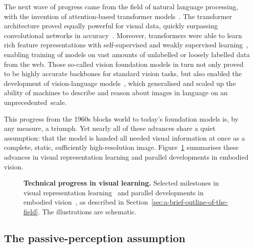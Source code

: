 The next wave of progress came from the field of natural language processing, with the invention of attention-based transformer models~\cite{vaswani2017attention}.
The transformer architecture proved equally powerful for visual data, quickly surpassing convolutional networks in accuracy~\cite{dosovitskiy2021image}.
Moreover, transformers were able to learn rich feature representations with self-supervised and weakly supervised learning~\cite{radford2021learning,caron2021emerging,he2022masked},
enabling training of models on vast amounts of unlabelled or loosely labelled data from the web. Those so-called vision foundation models in turn not only proved to be highly accurate backbones for standard vision tasks,
but also enabled the development of vision-language models~\cite{achiam2023gpt,team2023gemini}, which generalised and scaled up the ability of machines to describe and reason about images in language on an unprecedented~scale.

This progress from the 1960s blocks world to today's foundation models is, by any measure, a triumph. Yet nearly all of these
advances share a quiet assumption: that the model is handed all needed visual information at once as a complete, static, sufficiently high-resolution image. Figure~\ref{fig:technical-progress} summarises these advances in visual representation learning and parallel developments in embodied vision.

\begin{figure}[th]
\centering

\caption[Technical progress in visual learning]{\textbf{Technical progress in visual learning.}
Selected milestones in visual representation learning~\cite{roberts1963machine,lecun2015deep,dosovitskiy2021image,radford2021learning} and parallel developments in embodied vision~\cite{nilsson1984shakey,aloimonos1988active,ballard1991animate,mnih2014recurrent,ramakrishnan2021exploration}, as described in Section~\ref{sec:a-brief-outline-of-the-field}. The illustrations are schematic.}
\label{fig:technical-progress}
\end{figure}

\subsection{The passive-perception assumption}

